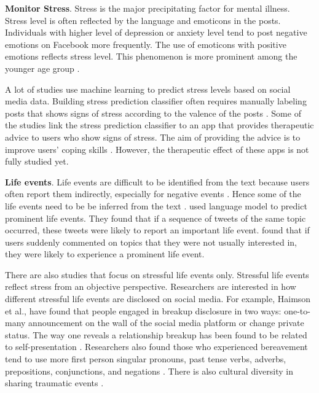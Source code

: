 \textbf{Monitor Stress}. Stress is the major precipitating factor for mental illness.  Stress level is often reflected by the language and emoticons in the posts. Individuals with higher level of depression or anxiety level tend to post negative emotions on Facebook more frequently. The use of emoticons with positive emotions reflects stress level. This phenomenon is more prominent among the younger age group \cite{settanni2015sharing}.

A lot of studies use machine learning to predict stress levels based on social media data. Building stress prediction classifier often requires manually labeling posts that shows signs of stress according to the valence of the posts \cite{thelwall2017tensistrength,mogadala2012twitter,lin2014user}. 
Some of the studies link the stress prediction classifier to an app that provides therapeutic advice to users who show signs of stress. The aim of providing the advice is to improve users' coping skills \cite{li2014helping}. However, the therapeutic effect of these apps is not fully studied yet.

\textbf{Life events}. Life events are difficult to be identified from the text because users often report them indirectly, especially for negative events \cite{bevan2015important}. Hence some of the life events need to be be inferred from the text \cite{khodabakhsh2018detecting,abe2018predicting}.  \citet{khodabakhsh2018detecting} used language model to predict prominent life events. They found that if a sequence of tweets of the same topic occurred, these tweets were likely to report an important life event.  \citet{dickinson2015identifying}found that if users suddenly commented on topics that they were not usually interested in, they were likely to experience a prominent life event.

There are also studies that focus on stressful life events only. Stressful life events reflect stress from an objective perspective. Researchers are interested in how different stressful life events are disclosed on social media. For example, Haimson et al., have found that people engaged in breakup disclosure in two ways: one-to-many announcement on the wall of the social media platform or change private status. The way one reveals a relationship breakup has been found to be related to self-presentation \cite{haimson2018relationship}. Researchers also found those who experienced bereavement tend to use more first person singular pronouns, past tense verbs, adverbs, prepositions, conjunctions, and negations \cite{brubaker2012grief}. There is also cultural diversity in sharing traumatic events \cite{freitag2011talking}. 

